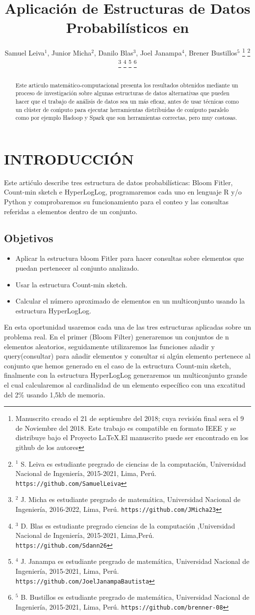 \documentclass[journal]{IEEEtran}
\title{\LARGE \bf Aplicaci\'on de Estructuras de Datos Probabil\'isticos en
}
\author{Samuel Leiva$^{1}$, Junior Micha$^{2}$, Danilo Blas$^{3}$, Joel Janampa$^{4}$, Brener Bustillos$^{5}$%
\thanks{Manuscrito creado el 21 de septiembre del 2018; cuya revisi\'on final sera el 9 de Noviembre del 2018. Este trabajo es compatible en formato IEEE y se distribuye bajo el Proyecto LaTeX.El manuscrito puede ser encontrado en los github de los autores}%
\thanks{$^{1}$ S. Leiva es estudiante pregrado de ciencias de la computaci\'on, Universidad Nacional de Ingenier\'ia, 2015-2021, Lima, Per\'u.
        {\tt\small https://github.com/SamuelLeiva}}%
\thanks{$^{2}$ J. Micha es estudiante pregrado de matem\'atica, Universidad Nacional de Ingenier\'ia, 2016-2022, Lima, Per\'u.
        {\tt\small https://github.com/JMicha23}}%
\thanks{$^{3}$ D. Blas es estudiante pregrado ciencias de la computaci\'on ,Universidad Nacional de Ingenier\'ia, 2015-2021, Lima,Per\'u.
        {\tt\small https://github.com/Sdann26}}%
\thanks{$^{4}$ J. Janampa es estudiante pregrado de matem\'atica, Universidad Nacional de Ingenier\'ia, 2015-2021, Lima, Per\'u.
        {\tt\small https://github.com/JoelJanampaBautista}}%
\thanks{$^{5}$ B. Bustillos es estudiante pregrado de matem\'atica, Universidad Nacional de Ingenier\'ia, 2015-2021, Lima, Per\'u. 
        {\tt\small https://github.com/brenner-08}}%
}
\begin{document}
\maketitle
\thispagestyle{empty}
\pagestyle{empty}


\begin{abstract}
    

Este articulo matem\'atico-computacional presenta los resultados obtenidos mediante un proceso de investigaci\'on sobre algunas estructuras de datos alternativas que pueden hacer que el trabajo de an\'alisis de datos sea un m\'as eficaz, antes de usar t\'ecnicas como un cl\'uster de co\'mputo para ejecutar herramientas distribuidas de co\'mputo paralelo como por ejemplo  Hadoop y Spark que son herramientas correctas, pero muy costosas.

\end{abstract}


\section{INTRODUCCI\'ON}

Este arti\'culo describe tres estructura de datos probabilísticas: Bloom Fitler, Count-min sketch e HyperLogLog, programaremos cada uno en lenguaje R y/o Python y comprobaremos su funcionamiento para el conteo y las consultas referidas a elementos dentro de un conjunto.

\subsection{Objetivos}
\begin{itemize}
    \item Aplicar la estructura bloom Fitler para hacer consultas sobre elementos que puedan pertenecer al conjunto analizado. 
    \item Usar la estructura Count-min sketch.
    \item Calcular el número aproximado de elementos en un multiconjunto usando la estructura HyperLogLog. 
\end{itemize}

En esta oportunidad usaremos cada una de las tres estructuras aplicadas sobre un problema real. En el primer (Bloom Filter) generaremos un conjuntos de n elementos aleatorios, seguidamente utilizaremos las funciones añadir y query(consultar) para añadir elementos y consultar si algún elemento pertenece al conjunto que hemos generado en el caso de la estructura Count-min sketch, finalmente con la estructura HyperLogLog generaremos un multiconjunto grande el cual calcularemos al cardinalidad de un elemento específico con una excatitud del 2\% usando 1,5kb de memoria.
\end{document}
